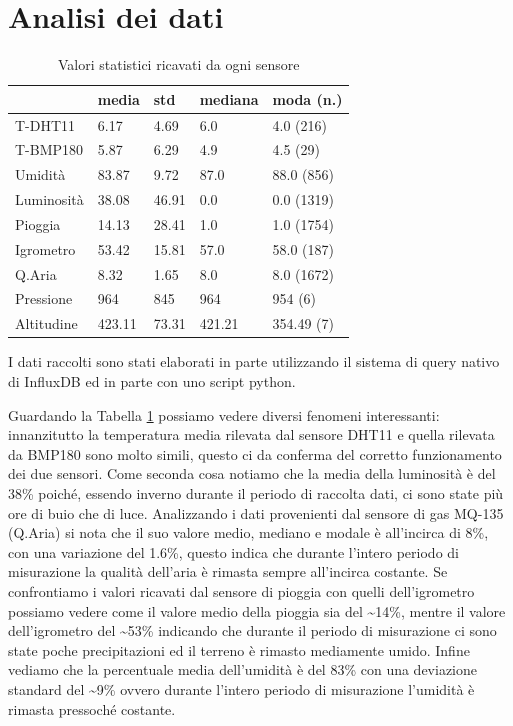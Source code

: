 \documentclass[fleqn, 10pt]{SelfArx}
\begin{document}
\section{Analisi dei dati}

\begin{table}[htb]
  \centering
  \small
  \begin{tabular}{ l l l l l }
    \hline
    & media & std & mediana & moda (n.) \\
    \hline
    T-DHT11 & 6.17 & 4.69 & 6.0 & 4.0 (216) \\
    T-BMP180 & 5.87 & 6.29 & 4.9 & 4.5 (29) \\
    Umidità & 83.87 & 9.72 & 87.0 & 88.0 (856) \\
    Luminosità & 38.08 & 46.91 & 0.0 & 0.0 (1319) \\
    Pioggia & 14.13 & 28.41 & 1.0 & 1.0 (1754) \\
    Igrometro & 53.42 & 15.81 & 57.0 & 58.0 (187) \\
    Q.Aria & 8.32 & 1.65 & 8.0 & 8.0 (1672) \\
    Pressione & 964 & 845 & 964 & 954 (6) \\
    Altitudine & 423.11 & 73.31 & 421.21 & 354.49 (7) \\
    \hline
  \end{tabular}
  \caption{ Valori statistici ricavati da ogni sensore }
  \label{tab:all_data_stats}
\end{table}

I dati raccolti sono stati elaborati in parte utilizzando il sistema di query nativo di InfluxDB\cite{flux} ed in parte con uno script python\cite{python}.

Guardando la Tabella \ref{tab:all_data_stats} possiamo vedere diversi fenomeni interessanti: innanzitutto la temperatura media rilevata dal sensore DHT11 e quella rilevata da BMP180 sono molto simili, 
questo ci da conferma del corretto funzionamento dei due sensori. Come seconda cosa notiamo che la media della luminosità è del 38\% poiché, essendo inverno durante il periodo di raccolta dati, 
ci sono state più ore di buio che di luce. Analizzando i dati provenienti dal sensore di gas MQ-135 (Q.Aria) si nota che il suo valore medio, mediano e modale è all'incirca di 8\%, con una variazione del 1.6\%, questo indica 
che durante l'intero periodo di misurazione la qualità dell'aria è rimasta sempre all'incirca costante. Se confrontiamo i valori ricavati dal sensore di pioggia con quelli dell'igrometro possiamo vedere 
come il valore medio della pioggia sia del \textasciitilde14\%, mentre il valore dell'igrometro del
\textasciitilde53\% indicando che durante il periodo di misurazione ci sono state poche precipitazioni ed il terreno è rimasto mediamente umido. Infine vediamo che la percentuale media dell'umidità è 
del 83\% con una deviazione standard del \textasciitilde9\% ovvero durante l'intero periodo di misurazione l'umidità è rimasta pressoché costante.
\end{document}
